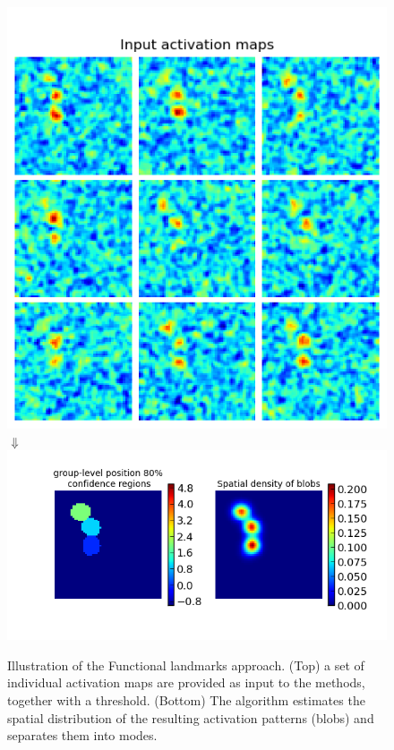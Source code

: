 \documentclass{bioinfo}
\begin{document}
\begin{figure}
\begin{center}
\includegraphics[width=\linewidth]{Figures/bsa_inputs.png}
{\Huge $\Downarrow$}
\includegraphics[width=\linewidth]{Figures/bsa_results.png}
\end{center}
\caption{Illustration of the Functional landmarks approach. (Top) a
  set of individual activation maps are provided as input to the
  methods, together with a threshold. (Bottom) The algorithm estimates
  the spatial distribution of the resulting activation patterns
  (blobs) and separates them into modes.}
\label{fig:landmarks}
\end{figure}
\end{document}
